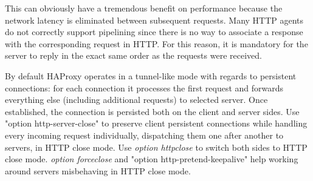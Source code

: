 This can obviously have a tremendous benefit on performance because the network
latency is eliminated between subsequent requests. Many HTTP agents do not
correctly support pipelining since there is no way to associate a response with
the corresponding request in HTTP. For this reason, it is mandatory for the
server to reply in the exact same order as the requests were received.


By default HAProxy operates in a tunnel-like mode with regards to persistent
connections: for each connection it processes the first request and forwards
everything else (including additional requests) to selected server. Once
established, the connection is persisted both on the client and server
sides. Use "option http-server-close" to preserve client persistent connections
while handling every incoming request individually, dispatching them one after
another to servers, in HTTP close mode. Use \emph{option httpclose} to switch both
sides to HTTP close mode. \emph{option forceclose} and "option
http-pretend-keepalive" help working around servers misbehaving in HTTP close
mode.

